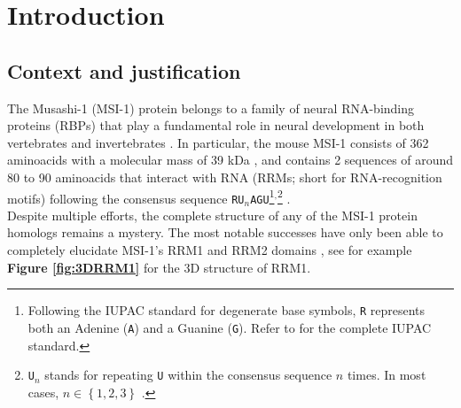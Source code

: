 \section{Introduction}

\subsection{Context and justification}

The Musashi-1 (MSI-1) protein belongs to a family of neural RNA-binding proteins (RBPs) that play a fundamental role in neural development in both vertebrates and invertebrates \cite{nakamura_1994,sakakibara_1996, good_1998, imai_2001}. In particular, the mouse MSI-1 consists of 362 aminoacids with a molecular mass of 39 kDa \cite{sakakibara_1996}, and contains 2 sequences of around 80 to 90 aminoacids that interact with RNA (RRMs; short for RNA-recognition motifs) following the consensus sequence \texttt{RU}$_n$\texttt{AGU}\footnote{Following the IUPAC standard for degenerate base symbols, \texttt{R} represents both an Adenine (\texttt{A}) and a Guanine (\texttt{G}). Refer to \cite{cornish_1985} for the complete IUPAC standard.}$^,$\footnote{\texttt{U}$_n$ stands for repeating \texttt{U} within the consensus sequence $n$ times. In most cases, $n\in\left\{1,2,3\right\}$ \cite{imai_2001}.} \cite{imai_2001,zearfoss_2014}.\\

Despite multiple efforts, the complete structure of any of the MSI-1 protein homologs remains a mystery. The most notable successes have only been able to completely elucidate MSI-1's RRM1 and RRM2 domains \cite{nagata_1999,miyanoiri_2003,ohyama_2011,lan_2019}, see for example \textbf{Figure \ref{fig:3DRRM1}} for the 3D structure of RRM1. 

